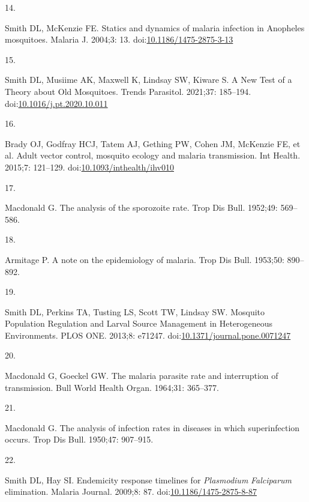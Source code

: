 \documentclass[
]{book}
\newlength{\cslhangindent}
\newlength{\csllabelwidth}
\newlength{\cslentryspacingunit} %
\newenvironment{CSLReferences}[2] %
 {%
  \setlength{\parindent}{0pt}
  \ifodd #1
  \let\oldpar\par
  \def\par{\hangindent=\cslhangindent\oldpar}
  \fi
  \setlength{\parskip}{#2\cslentryspacingunit}
 }%
 {}
\newcommand{\CSLLeftMargin}[1]{\parbox[t]{\csllabelwidth}{#1}}
\newcommand{\CSLRightInline}[1]{\parbox[t]{\linewidth - \csllabelwidth}{#1}\break}
\begin{document}
\begin{CSLReferences}{0}{0}
\leavevmode{}%
\CSLLeftMargin{14. }%
\CSLRightInline{Smith DL, McKenzie FE. Statics and dynamics of malaria infection in {Anopheles} mosquitoes. Malaria J. 2004;3: 13. doi:\href{https://doi.org/10.1186/1475-2875-3-13}{10.1186/1475-2875-3-13}}

\leavevmode{}%
\CSLLeftMargin{15. }%
\CSLRightInline{Smith DL, Musiime AK, Maxwell K, Lindsay SW, Kiware S. A {New Test} of a {Theory} about {Old Mosquitoes}. Trends Parasitol. 2021;37: 185--194. doi:\href{https://doi.org/10.1016/j.pt.2020.10.011}{10.1016/j.pt.2020.10.011}}

\leavevmode{}%
\CSLLeftMargin{16. }%
\CSLRightInline{Brady OJ, Godfray HCJ, Tatem AJ, Gething PW, Cohen JM, McKenzie FE, et al. Adult vector control, mosquito ecology and malaria transmission. Int Health. 2015;7: 121--129. doi:\href{https://doi.org/10.1093/inthealth/ihv010}{10.1093/inthealth/ihv010}}

\leavevmode{}%
\CSLLeftMargin{17. }%
\CSLRightInline{Macdonald G. The analysis of the sporozoite rate. Trop Dis Bull. 1952;49: 569--586. }

\leavevmode{}%
\CSLLeftMargin{18. }%
\CSLRightInline{Armitage P. A note on the epidemiology of malaria. Trop Dis Bull. 1953;50: 890--892. }

\leavevmode{}%
\CSLLeftMargin{19. }%
\CSLRightInline{Smith DL, Perkins TA, Tusting LS, Scott TW, Lindsay SW. Mosquito {Population Regulation} and {Larval Source Management} in {Heterogeneous Environments}. PLOS ONE. 2013;8: e71247. doi:\href{https://doi.org/10.1371/journal.pone.0071247}{10.1371/journal.pone.0071247}}

\leavevmode{}%
\CSLLeftMargin{20. }%
\CSLRightInline{Macdonald G, Goeckel GW. The malaria parasite rate and interruption of transmission. Bull World Health Organ. 1964;31: 365--377. }

\leavevmode{}%
\CSLLeftMargin{21. }%
\CSLRightInline{Macdonald G. The analysis of infection rates in diseases in which superinfection occurs. Trop Dis Bull. 1950;47: 907--915. }

\leavevmode{}%
\CSLLeftMargin{22. }%
\CSLRightInline{Smith DL, Hay SI. Endemicity response timelines for {\emph{Plasmodium}}{ \emph{Falciparum}} elimination. Malaria Journal. 2009;8: 87. doi:\href{https://doi.org/10.1186/1475-2875-8-87}{10.1186/1475-2875-8-87}}


\end{CSLReferences}
\end{document}
